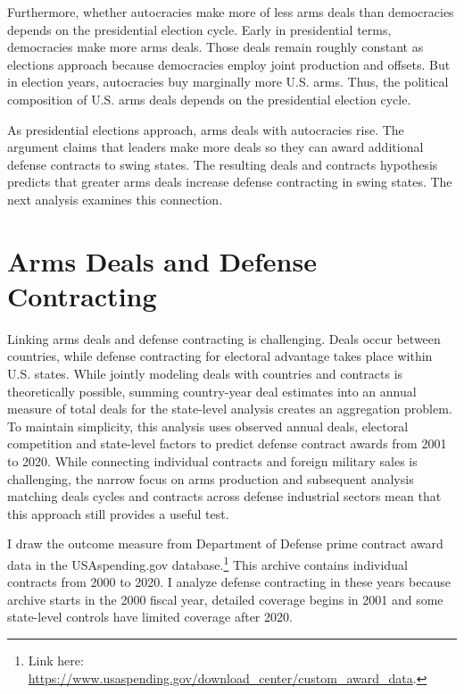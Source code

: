\documentclass[12pt]{article}
\begin{document}
Furthermore, whether autocracies make more of less arms deals than democracies depends on the presidential election cycle. 
Early in presidential terms, democracies make more arms deals. 
Those deals remain roughly constant as elections approach because democracies employ joint production and offsets. 
But in election years, autocracies buy marginally more U.S. arms. 
Thus, the political composition of U.S. arms deals depends on the presidential election cycle. 


As presidential elections approach, arms deals with autocracies rise. 
The argument claims that leaders make more deals so they can award additional defense contracts to swing states. 
The resulting deals and contracts hypothesis predicts that greater arms deals increase defense contracting in swing states. 
The next analysis examines this connection.


\section{Arms Deals and Defense Contracting}


Linking arms deals and defense contracting is challenging. 
Deals occur between countries, while defense contracting for electoral advantage takes place within U.S. states.
While jointly modeling deals with countries and contracts is theoretically possible, summing country-year deal estimates into an annual measure of total deals for the state-level analysis creates an aggregation problem. %
To maintain simplicity, this analysis uses observed annual deals, electoral competition and state-level factors to predict defense contract awards from 2001 to 2020. 
While connecting individual contracts and foreign military sales is challenging, the narrow focus on arms production and subsequent analysis matching deals cycles and contracts across defense industrial sectors mean that this approach still provides a useful test. 



I draw the outcome measure from Department of Defense prime contract award data in the USAspending.gov database.\footnote{Link here: \url{https://www.usaspending.gov/download_center/custom_award_data}.} 
This archive contains individual contracts from 2000 to 2020.
I analyze defense contracting in these years because archive starts in the 2000 fiscal year, detailed coverage begins in 2001 and some state-level controls have limited coverage after 2020.
\end{document}
